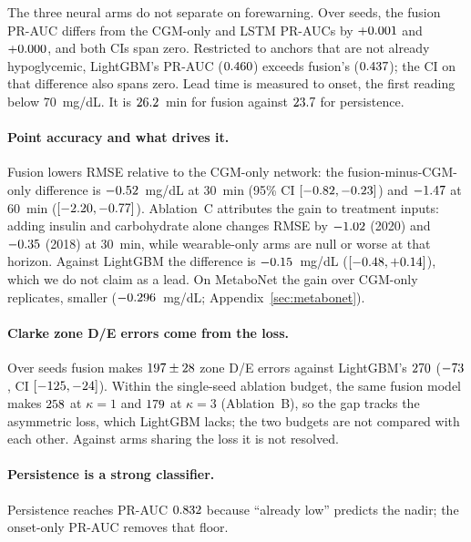 \documentclass[pmlr,twocolumn,10pt]{jmlr}
\begin{document}
The three neural arms do not separate on forewarning. Over seeds, the fusion
PR-AUC differs from the CGM-only and LSTM PR-AUCs by
$+0.001$ and $+0.000$, and both CIs
span zero. Restricted to anchors that are not already hypoglycemic, LightGBM's
PR-AUC ($0.460$) exceeds fusion's
($0.437$); the CI on that difference also spans
zero. Lead time is measured to onset, the first reading below 70~mg/dL. It is
$26.2$~min for fusion against
$23.7$ for persistence.

\paragraph{Point accuracy and what drives it.} Fusion lowers RMSE relative to
the CGM-only network: the fusion-minus-CGM-only difference is
$-0.52$~mg/dL at 30~min (95\% CI
$[-0.82, -0.23]$) and
$-1.47$ at 60~min
($[-2.20, -0.77]$). Ablation~C
attributes the gain to treatment inputs: adding insulin and carbohydrate alone
changes RMSE by $-1.02$ (2020) and
$-0.35$ (2018) at 30~min, while wearable-only arms
are null or worse at that horizon. Against LightGBM the difference is
$-0.15$~mg/dL
($[-0.48, +0.14]$), which we do not
claim as a lead. On MetaboNet the gain over CGM-only replicates, smaller
($-0.296$~mg/dL; Appendix~\ref{sec:metabonet}).

\paragraph{Clarke zone D/E errors come from the loss.} Over seeds fusion makes
$197 \pm 28$ zone D/E errors against
LightGBM's $270$
($-73$, CI $[-125,
-24]$). Within the single-seed ablation budget, the same
fusion model makes $258$ at $\kappa = 1$ and $179$ at
$\kappa = 3$ (Ablation~B), so the gap tracks the asymmetric loss, which
LightGBM lacks; the two budgets are not compared with each other. Against arms sharing the loss it is not resolved.

\paragraph{Persistence is a strong classifier.} Persistence reaches PR-AUC
$0.832$ because ``already low'' predicts the nadir; the
onset-only PR-AUC removes that floor.
\end{document}
